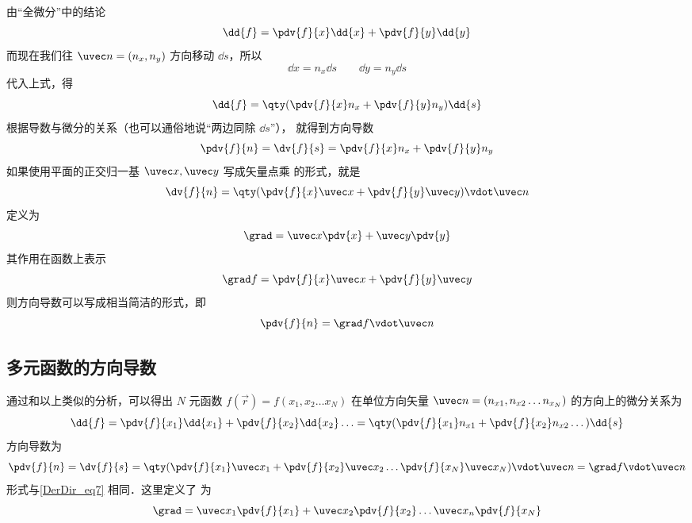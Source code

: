 由“全微分”中的结论
\begin{equation}
\dd{f} = \pdv{f}{x} \dd{x} + \pdv{f}{y} \dd{y}
\end{equation}
而现在我们往 $\uvec n = (n_x, n_y)$ 方向移动 $\dd{s}$，所以
\begin{equation}
\dd{x} = n_x \dd{s} \qquad \dd{y} = n_y \dd{s}
\end{equation}
代入上式，得
\begin{equation}
\dd{f} =  \qty(\pdv{f}{x} n_x + \pdv{f}{y} n_y ) \dd{s}
\end{equation}
根据导数与微分的关系（也可以通俗地说“两边同除 $\dd{s}$”）， 就得到方向导数
\begin{equation}
\pdv{f}{n} = \dv{f}{s} = \pdv{f}{x} n_x + \pdv{f}{y} n_y
\end{equation}
如果使用平面的正交归一基 $\uvec x, \uvec y$ 写成矢量点乘 的形式，就是
\begin{equation}
\dv{f}{n} = \qty( \pdv{f}{x}\uvec x + \pdv{f}{y}\uvec y ) \vdot \uvec n
\end{equation} 
定义为
\begin{equation}
\grad  = \uvec x\pdv{x} + \uvec y\pdv{y}
\end{equation}
其作用在函数上表示
\begin{equation}
\grad f = \pdv{f}{x}\uvec x + \pdv{f}{y}\uvec y
\end{equation} 
则方向导数可以写成相当简洁的形式，即
\begin{equation}\label{DerDir_eq7}
\pdv{f}{n} = \grad f \vdot \uvec n
\end{equation} 

\subsection{多元函数的方向导数}
通过和以上类似的分析，可以得出 $N$ 元函数 $f(\vec r) = f(x_1,x_2\dots x_N)$ 在单位方向矢量 $\uvec n = (n_{x1}, n_{x2} \dots n_{x_N})$ 的方向上的微分关系为
\begin{equation}
\dd{f} = \pdv{f}{x_1} \dd{x_1} + \pdv{f}{x_2} \dd{x_2}\ldots = \qty( \pdv{f}{x_1}n_{x1} + \pdv{f}{x_2} n_{x2}\dots ) \dd{s}
\end{equation}
方向导数为
\begin{equation}
\pdv{f}{n} = \dv{f}{s} = \qty( \pdv{f}{x_1}\uvec x_1 + \pdv{f}{x_2}\uvec x_2\ldots  \pdv{f}{x_N}\uvec x_N ) \vdot \uvec n = \grad f \vdot \uvec n
\end{equation} 
形式与\autoref{DerDir_eq7} 相同．这里定义了 为
\begin{equation}
\grad  = \uvec x_1\pdv{f}{x_1} + \uvec x_2\pdv{f}{x_2} \dots \uvec x_n\pdv{f}{x_N}
\end{equation}



